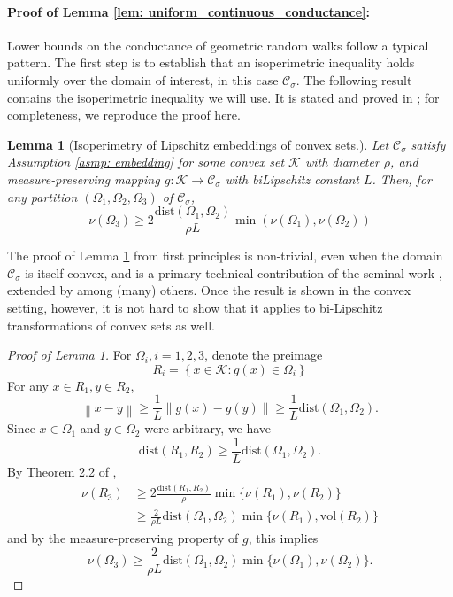 \documentclass[11pt,twoside]{article}
\newtheorem{lemma}{Lemma}
\newcommand{\set}[1]{\left\{#1\right\}}
\newcommand{\vol}{\mathrm{vol}}
\newcommand{\norm}[1]{\left\lVert#1\right\rVert}
\newcommand{\1}{\mathbf{1}}
\newcommand{\dist}{\mathrm{dist}}
\newcommand{\Cset}{\mathcal{C}}
\newcommand{\Csig}{\Cset_{\sigma}}
\begin{document}
\paragraph{Proof of Lemma \ref{lem: uniform_continuous_conductance}:}
Lower bounds on the conductance of geometric random walks follow a typical pattern. The first step is to establish that an isoperimetric inequality holds uniformly over the domain of interest, in this case $\Csig$. The following result contains the isoperimetric inequality we will use. It is stated and proved in \cite{abbasi-yadkori2016a}; for completeness, we reproduce the proof here.
\begin{lemma}[Isoperimetry of Lipschitz embeddings of convex sets.]
	\label{lem: nonconvex_isoperimetry}
	Let $\Csig$ satisfy Assumption \ref{asmp: embedding} for some convex set $\mathcal{K}$ with diameter $\rho$, and measure-preserving mapping $g: \mathcal{K} \to \Csig$ with biLipschitz constant $L$. Then, for any partition $(\Omega_1,\Omega_2,\Omega_3)$ of $\Csig$, 
	\begin{equation*}
	\nu(\Omega_3) \geq 2\frac{\dist(\Omega_1, \Omega_2)}{\rho L} \min(\nu(\Omega_1), \nu(\Omega_2))
	\end{equation*}
\end{lemma}
The proof of Lemma \ref{lem: nonconvex_isoperimetry} from first principles is non-trivial, even when the domain $\Csig$ is itself convex, and is a primary technical contribution of the seminal work \cite{lovasz1990}, extended by \cite{dyer1991} among (many) others. Once the result is shown in the convex setting, however, it is not hard to show that it applies to bi-Lipschitz transformations of convex sets as well.
\begin{proof}[Proof of Lemma \ref{lem: nonconvex_isoperimetry}]
	For $\Omega_i, i = 1,2,3$, denote the preimage
	\begin{equation*}
	R_i = \set{x \in \mathcal{K}: g(x) \in \Omega_i}
	\end{equation*}
	For any $x \in R_1, y \in R_2$, 
	\begin{equation*}
	\norm{x - y} \geq \frac{1}{L}\norm{g(x) - g(y)} \geq \frac{1}{L} \dist(\Omega_1, \Omega_2). 
	\end{equation*}
	Since $x \in \Omega_1$ and $y \in \Omega_2$ were arbitrary, we have
	\begin{equation*}
	\dist(R_1, R_2) \geq \frac{1}{L} \dist(\Omega_1, \Omega_2).
	\end{equation*}
	By Theorem 2.2 of \cite{lovasz1990},
	\begin{align*}
	\nu(R_3) & \geq 2\frac{\dist(R_1, R_2)}{\rho} \min \{\nu(R_1), \nu(R_2)\} \\
	& \geq \frac{2}{\rho L} \dist(\Omega_1, \Omega_2) \min\{\nu(R_1), \vol(R_2)\}
	\end{align*}
	and by the measure-preserving property of $g$, this implies
	\begin{equation*}
	\nu(\Omega_3) \geq\frac{2}{\rho L} \dist(\Omega_1, \Omega_2) \min\{\nu(\Omega_1), \nu(\Omega_2)\}.
	\end{equation*}
\end{proof}
\end{document}
